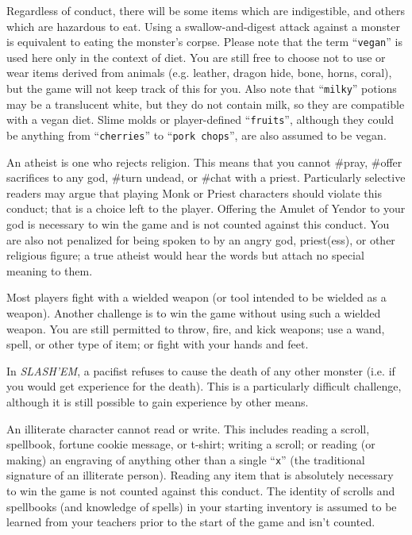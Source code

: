 Regardless of conduct, there will be some items which are indigestible,
and others which are hazardous to eat.  Using a swallow-and-digest
attack against a monster is equivalent to eating the monster's corpse.
Please note that the term ``{\tt vegan}'' is used here only in the context of
diet.  You are still free to choose not to use or wear items derived
from animals (e.g. leather, dragon hide, bone, horns, coral), but the
game will not keep track of this for you.  Also note that ``{\tt milky}''
potions may be a translucent white, but they do not contain milk,
so they are compatible with a vegan diet.  Slime molds or
player-defined ``{\tt fruits}'', although they could be anything
from ``{\tt cherries}'' to ``{\tt pork chops}'', are also assumed to be vegan.

An atheist is one who rejects religion.  This means that you cannot
\#pray, \#offer sacrifices to any god, \#turn undead, or \#chat with a priest.
Particularly selective readers may argue that playing Monk or Priest
characters should violate this conduct; that is a choice left to the
player.  Offering the Amulet of Yendor to your god is necessary to
win the game and is not counted against this conduct.  You are also
not penalized for being spoken to by an angry god, priest(ess), or
other religious figure; a true atheist would hear the words but
attach no special meaning to them.

Most players fight with a wielded weapon (or tool intended to be
wielded as a weapon).  Another challenge is to win the game without
using such a wielded weapon.  You are still permitted to throw,
fire, and kick weapons; use a wand, spell, or other type of item;
or fight with your hands and feet.

In {\it SLASH'EM}, a pacifist refuses to cause the death of any other monster
(i.e. if you would get experience for the death).  This is a particularly
difficult challenge, although it is still possible to gain experience
by other means.

An illiterate character cannot read or write.  This includes reading
a scroll, spellbook, fortune cookie message, or t-shirt; writing a
scroll; or reading (or
making) an engraving of anything other than a single ``{\tt x}'' (the
traditional signature of an illiterate person).  Reading
any item that is absolutely necessary to win the game is not counted
against this conduct.  The identity of scrolls and spellbooks (and
knowledge of spells) in your starting inventory is assumed to be
learned from your teachers prior to the start of the game and isn't
counted.

